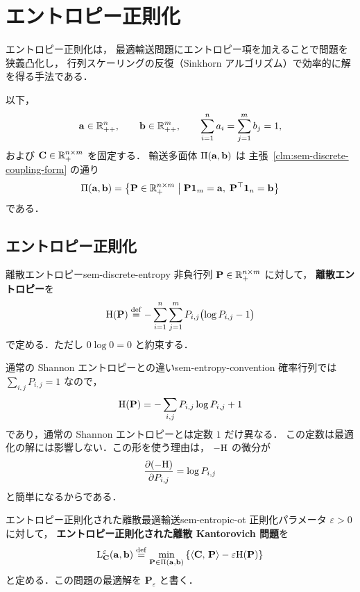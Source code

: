\chapter{エントロピー正則化}
\label{ch:seminar-03-entropic}

エントロピー正則化は，
最適輸送問題にエントロピー項を加えることで問題を狭義凸化し，
行列スケーリングの反復（Sinkhorn アルゴリズム）で効率的に解を得る手法である．

以下，
\[
  \mathbf{a} \in \mathbb{R}_{++}^{n},\qquad
  \mathbf{b} \in \mathbb{R}_{++}^{m},\qquad
  \sum_{i=1}^{n} a_i = \sum_{j=1}^{m} b_j = 1,
\]
および $\mathbf{C} \in \mathbb{R}_+^{n \times m}$ を固定する．
輸送多面体 $\Pi(\mathbf{a}, \mathbf{b})$ は
主張~\ref{clm:sem-discrete-coupling-form} の通り
\[
  \Pi(\mathbf{a}, \mathbf{b})
  =
  \left\{
    \mathbf{P} \in \mathbb{R}_+^{n \times m}
    \;\middle|\;
    \mathbf{P}\mathbf{1}_m = \mathbf{a},\;
    \mathbf{P}^\top \mathbf{1}_n = \mathbf{b}
  \right\}
\]
である．

\section{エントロピー正則化}
\label{sec:sem-entropic-regularization}

\begin{definition}{離散エントロピー}{sem-discrete-entropy}
  非負行列 $\mathbf{P} \in \mathbb{R}_+^{n \times m}$ に対して，
  \textbf{離散エントロピー}を
  \[
    \mathrm{H}(\mathbf{P})
    \overset{\mathrm{def}}{=}
    - \sum_{i=1}^{n} \sum_{j=1}^{m}
      P_{i,j}\bigl(\log P_{i,j} - 1\bigr)
  \]
  で定める．ただし $0\log 0 = 0$ と約束する．
\end{definition}

\begin{remark}{通常の Shannon エントロピーとの違い}{sem-entropy-convention}
  確率行列では $\sum_{i,j}P_{i,j}=1$ なので，
  \[
    \mathrm{H}(\mathbf{P})
    =
    -\sum_{i,j} P_{i,j}\log P_{i,j} + 1
  \]
  であり，通常の Shannon エントロピーとは定数 $1$ だけ異なる．
  この定数は最適化の解には影響しない．この形を使う理由は，
  $-\mathrm{H}$ の微分が
  \[
    \frac{\partial(-\mathrm{H})}{\partial P_{i,j}} = \log P_{i,j}
  \]
  と簡単になるからである．
\end{remark}

\begin{definition}{エントロピー正則化された離散最適輸送}{sem-entropic-ot}
  正則化パラメータ $\varepsilon > 0$ に対して，
  \textbf{エントロピー正則化された離散 Kantorovich 問題}を
  \[
    \mathrm{L}_{\mathbf{C}}^\varepsilon(\mathbf{a}, \mathbf{b})
    \overset{\mathrm{def}}{=}
    \min_{\mathbf{P} \in \Pi(\mathbf{a}, \mathbf{b})}
    \left\{
      \langle \mathbf{C},\, \mathbf{P} \rangle
      - \varepsilon \mathrm{H}(\mathbf{P})
    \right\}
  \]
  と定める．この問題の最適解を $\mathbf{P}_\varepsilon$ と書く．
\end{definition}

